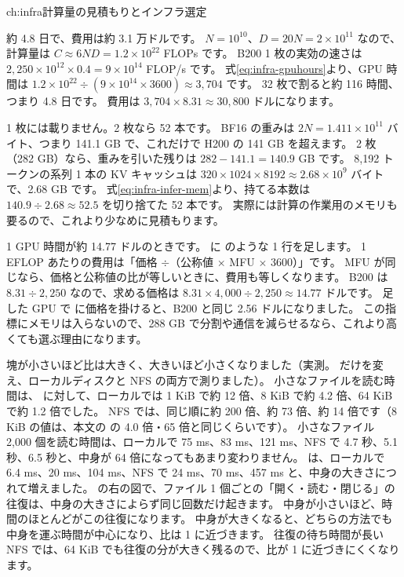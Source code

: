 \begin{answers}{ch:infra}{計算量の見積もりとインフラ選定}
\item 約 4.8 日で、費用は約 3.1 万ドルです。
$N=10^{10}$、$D=20N=2\times10^{11}$ なので、計算量は $C\approx6ND=1.2\times10^{22}$ FLOPs です。
B200 1 枚の実効の速さは $2{,}250\times10^{12}\times0.4=9\times10^{14}$ FLOP/s です。
式\eqref{eq:infra-gpuhours}より、GPU 時間は $1.2\times10^{22}\div(9\times10^{14}\times3600)\approx3{,}704$ です。
32 枚で割ると約 116 時間、つまり 4.8 日です。
費用は $3{,}704\times8.31\approx30{,}800$ ドルになります。
\item 1 枚には載りません。2 枚なら 52 本です。
BF16 の重みは $2N=1.411\times10^{11}$ バイト、つまり 141.1 GB で、これだけで H200 の 141 GB を超えます。
2 枚（282 GB）なら、重みを引いた残りは $282-141.1=140.9$ GB です。
8,192 トークンの系列 1 本の KV キャッシュは $320\times1024\times8192\approx2.68\times10^{9}$ バイトで、2.68 GB です。
式\eqref{eq:infra-infer-mem}より、持てる本数は $140.9\div2.68\approx52.5$ を切り捨てた 52 本です。
実際には計算の作業用のメモリも要るので、これより少なめに見積もります。
\item 1 GPU 時間が約 14.77 ドルのときです。
 に  のような 1 行を足します。
1 EFLOP あたりの費用は「価格 $\div$（公称値 $\times$ MFU $\times$ 3600）」です。
MFU が同じなら、価格と公称値の比が等しいときに、費用も等しくなります。
B200 は $8.31\div2{,}250$ なので、求める価格は $8.31\times4{,}000\div2{,}250\approx14.77$ ドルです。
足した GPU で  に価格を掛けると、B200 と同じ 2.56 ドルになりました。
この指標にメモリは入らないので、288 GB で分割や通信を減らせるなら、これより高くても選ぶ理由になります。
\item 塊が小さいほど比は大きく、大きいほど小さくなりました（実測。 だけを変え、ローカルディスクと NFS の両方で測りました）。
小さなファイルを読む時間は、 に対して、ローカルでは 1 KiB で約 12 倍、8 KiB で約 4.2 倍、64 KiB で約 1.2 倍でした。
NFS では、同じ順に約 200 倍、約 73 倍、約 14 倍です（8 KiB の値は、本文の  の 4.0 倍・65 倍と同じくらいです）。
小さなファイル 2,000 個を読む時間は、ローカルで 75 ms、83 ms、121 ms、NFS で 4.7 秒、5.1 秒、6.5 秒と、中身が 64 倍になってもあまり変わりません。
 は、ローカルで 6.4 ms、20 ms、104 ms、NFS で 24 ms、70 ms、457 ms と、中身の大きさにつれて増えました。
の右の図で、ファイル 1 個ごとの「開く・読む・閉じる」の往復は、中身の大きさによらず同じ回数だけ起きます。
中身が小さいほど、時間のほとんどがこの往復になります。
中身が大きくなると、どちらの方法でも中身を運ぶ時間が中心になり、比は 1 に近づきます。
往復の待ち時間が長い NFS では、64 KiB でも往復の分が大きく残るので、比が 1 に近づきにくくなります。


\end{answers}
